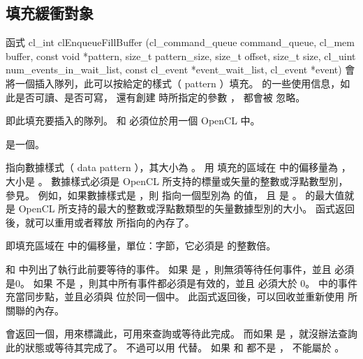 \subsection{填充緩衝對象}

函式
\startclc
cl_int clEnqueueFillBuffer (cl_command_queue command_queue,
			cl_mem buffer,
			const void *pattern,
			size_t pattern_size,
			size_t offset,
			size_t size,
			cl_uint num_events_in_wait_list,
			const cl_event *event_wait_list,
			cl_event *event)
\stopclc
會將一個插入隊列，此可以按給定的樣式（ pattern ）填充。
 的一些使用信息，如此是否可讀、是否可寫，
還有創建  時所指定的參數 ，
都會被  忽略。

 即此填充要插入的隊列。
 和  必須位於用一個 OpenCL 中。

 是一個。

 指向數據樣式（ data pattern ），其大小為 。
用  填充的區域在  中的偏移量為 ，大小是 。
數據樣式必須是 OpenCL 所支持的標量或矢量的整數或浮點數型別，參見。
例如，如果數據樣式是 ，則  指向一個型別為  的值，
且  是 。
 的最大值就是 OpenCL 所支持的最大的整數或浮點數類型的矢量數據型別的大小。
函式返回後，就可以重用或者釋放  所指向的內存了。

 即填充區域在  中的偏移量，單位：字節，它必須是  的整數倍。

 和  中列出了執行此前要等待的事件。
如果  是 ，則無須等待任何事件，並且  必須是0。
如果  不是 ，則其中所有事件都必須是有效的，並且  必須大於 0。
 中的事件充當同步點，並且必須與  位於同一個中。
此函式返回後，可以回收並重新使用  所關聯的內存。

 會返回一個，用來標識此，可用來查詢或等待此完成。
而如果  是 ，就沒辦法查詢此的狀態或等待其完成了。
不過可以用  代替。
如果  和  都不是 ，  不能屬於 。

